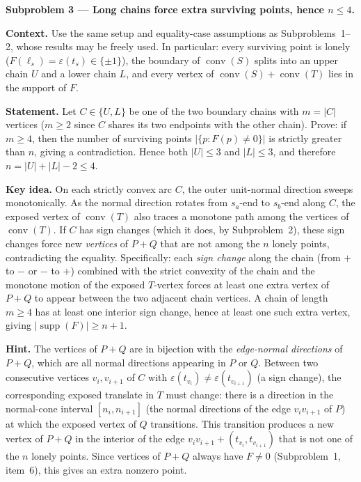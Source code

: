 \documentclass{article}
\begin{document}
\textbf{Subproblem 3 --- Long chains force extra surviving points, hence $n\le 4$.}

\medskip
\textbf{Context.}
Use the same setup and equality-case assumptions as Subproblems~1--2, whose
results may be freely used.  In particular: every surviving point is lonely
($F(\ell_s)=\varepsilon(t_s)\in\{\pm1\}$), the boundary of $\operatorname{conv}(S)$
splits into an upper chain $U$ and a lower chain $L$, and every vertex of
$\operatorname{conv}(S)+\operatorname{conv}(T)$ lies in the support of $F$.

\medskip
\textbf{Statement.}  Let $C\in\{U,L\}$ be one of the two boundary chains with
$m = |C|$ vertices ($m\ge 2$ since $C$ shares its two endpoints with the other
chain).  Prove: if $m\ge 4$, then the number of surviving points
$|\{p:F(p)\neq 0\}|$ is strictly greater than $n$, giving a contradiction.
Hence both $|U|\le 3$ and $|L|\le 3$, and therefore $n = |U|+|L|-2 \le 4$.

\medskip
\textbf{Key idea.}
On each strictly convex arc $C$, the outer unit-normal direction sweeps
monotonically.  As the normal direction rotates from $s_a$-end to $s_b$-end
along $C$, the exposed vertex of $\operatorname{conv}(T)$ also traces a monotone
path among the vertices of $\operatorname{conv}(T)$.  If $C$ has sign changes
(which it does, by Subproblem~2), these sign changes force new \emph{vertices}
of $P+Q$ that are not among the $n$ lonely points, contradicting the equality.
Specifically: each \emph{sign change} along the chain (from $+$ to $-$ or
$-$ to $+$) combined with the strict convexity of the chain and the monotone
motion of the exposed $T$-vertex forces at least one extra vertex of $P+Q$
to appear between the two adjacent chain vertices.  A chain of length $m\ge 4$
has at least one interior sign change, hence at least one such extra vertex,
giving $|\operatorname{supp}(F)|\ge n+1$.

\medskip
\textbf{Hint.}
The vertices of $P+Q$ are in bijection with the \emph{edge-normal directions} of
$P+Q$, which are all normal directions appearing in $P$ or $Q$.  Between two
consecutive vertices $v_i, v_{i+1}$ of $C$ with $\varepsilon(t_{v_i})\neq
\varepsilon(t_{v_{i+1}})$ (a sign change), the corresponding exposed
translate in $T$ must change: there is a direction in the normal-cone interval
$[n_i, n_{i+1}]$ (the normal directions of the edge $v_iv_{i+1}$ of $P$) at
which the exposed vertex of $Q$ transitions.  This transition produces a new
vertex of $P+Q$ in the interior of the edge $v_iv_{i+1}+(t_{v_i},t_{v_{i+1}})$
that is not one of the $n$ lonely points.  Since vertices of $P+Q$ always have
$F\neq 0$ (Subproblem~1, item~6), this gives an extra nonzero point.
\end{document}
